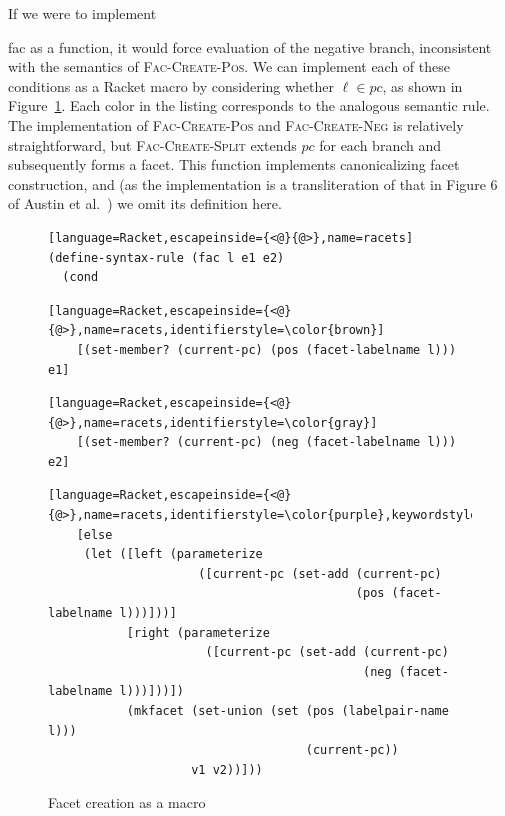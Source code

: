 \documentclass[review=true,acmlarge]{acmart}
\newcommand*{\SavedLstInline}{}
\DeclareRobustCommand*{\lstinline}{%
  \ifmmode
    \let\SavedBGroup\bgroup
    \def\bgroup{%
      \let\bgroup\SavedBGroup
      \hbox\bgroup
    }%
  \fi
  \SavedLstInline
}
\newcommand{\colorMATH}{black!20!blue}
\newcommand{\bmth}[1] {{\color{\colorMATH} $#1$}}
\newcommand{\code}[1]{\lstinline{#1}}
\begin{document}
If we were to implement \code{fac} as a function, it would force
evaluation of the negative branch, inconsistent with the semantics of
\textsc{Fac-Create-Pos}. We can implement each of these conditions as
a Racket macro by considering whether \bmth{\ell \in pc}, as shown in
Figure~\ref{fig:fac-create}. Each color in the listing corresponds to
the analogous semantic rule. The implementation of
\textsc{Fac-Create-Pos} and \textsc{Fac-Create-Neg} is relatively
straightforward, but \textsc{Fac-Create-Split} extends \bmth{pc} for
each branch and subsequently forms a facet. This function implements
canonicalizing facet construction, and (as the implementation is a
transliteration of that in Figure 6 of Austin et
al.~\cite{Austin:2012}) we omit its definition here.

\begin{figure}
{\small
\begin{lstlisting}[language=Racket,escapeinside={<@}{@>},name=racets]
(define-syntax-rule (fac l e1 e2)
  (cond
\end{lstlisting}
\vspace{-.7\baselineskip}
{\color{brown}
\begin{lstlisting}[language=Racket,escapeinside={<@}{@>},name=racets,identifierstyle=\color{brown}]
    [(set-member? (current-pc) (pos (facet-labelname l))) e1]
\end{lstlisting}
}
\vspace{-.7\baselineskip}
{\color{gray}
\begin{lstlisting}[language=Racket,escapeinside={<@}{@>},name=racets,identifierstyle=\color{gray}]
    [(set-member? (current-pc) (neg (facet-labelname l))) e2]
\end{lstlisting}
}
\vspace{-.7\baselineskip}
{\small\color{purple}
\begin{lstlisting}[language=Racket,escapeinside={<@}{@>},name=racets,identifierstyle=\color{purple},keywordstyle=\color{purple}]
    [else
     (let ([left (parameterize
                     ([current-pc (set-add (current-pc)
                                           (pos (facet-labelname l)))]))]
           [right (parameterize
                      ([current-pc (set-add (current-pc)
                                            (neg (facet-labelname l)))]))])
           (mkfacet (set-union (set (pos (labelpair-name l)))
                                    (current-pc))
                    v1 v2))]))
\end{lstlisting}}
}
\caption{Facet creation as a macro}
\label{fig:fac-create}
\end{figure}
\end{document}
